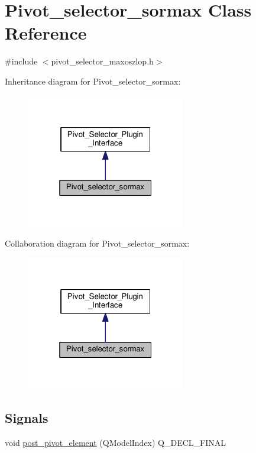 \hypertarget{classPivot__selector__sormax}{}\section{Pivot\+\_\+selector\+\_\+sormax Class Reference}
\label{classPivot__selector__sormax}


{\ttfamily \#include $<$pivot\+\_\+selector\+\_\+maxoszlop.\+h$>$}



Inheritance diagram for Pivot\+\_\+selector\+\_\+sormax\+:\nopagebreak
\begin{figure}[H]
\begin{center}
\leavevmode
\includegraphics[width=196pt]{classPivot__selector__sormax__inherit__graph}
\end{center}
\end{figure}


Collaboration diagram for Pivot\+\_\+selector\+\_\+sormax\+:\nopagebreak
\begin{figure}[H]
\begin{center}
\leavevmode
\includegraphics[width=196pt]{classPivot__selector__sormax__coll__graph}
\end{center}
\end{figure}
\subsection*{Signals}
\begin{DoxyCompactItemize}
\item 
void \hyperlink{classPivot__selector__sormax_a1f19dc653e774ae625a96695469a411c}{post\+\_\+pivot\+\_\+element} (Q\+Model\+Index) Q\+\_\+\+D\+E\+C\+L\+\_\+\+F\+I\+N\+AL
\end{DoxyCompactItemize}
